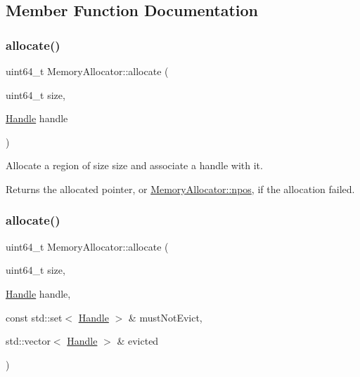 \subsection{Member Function Documentation}
\mbox{\label{classglow_1_1_memory_allocator_a8bd7c15304cb54909cbba8878ea57f7b}} 
\subsubsection{\texorpdfstring{allocate()}{allocate()}\hspace{0.1cm}{\footnotesize\ttfamily [1/2]}}
{\footnotesize\ttfamily uint64\+\_\+t Memory\+Allocator\+::allocate (\begin{DoxyParamCaption}\item[{uint64\+\_\+t}]{size,  }\item[{\hyperlink{classglow_1_1_memory_allocator_a8ebc21e1c9250f73f2e85aca3ae4ae9d}{Handle}}]{handle }\end{DoxyParamCaption})}

Allocate a region of size {\ttfamily size} and associate a {\ttfamily handle} with it. \begin{DoxyReturn}{Returns}
the allocated pointer, or \hyperlink{classglow_1_1_memory_allocator_a41dc4f17fc3b4e242406d9d4a9b419d5}{Memory\+Allocator\+::npos}, if the allocation failed. 
\end{DoxyReturn}
\mbox{\label{classglow_1_1_memory_allocator_a10636a2d9429529641393c60a8f2e4d5}} 
\subsubsection{\texorpdfstring{allocate()}{allocate()}\hspace{0.1cm}{\footnotesize\ttfamily [2/2]}}
{\footnotesize\ttfamily uint64\+\_\+t Memory\+Allocator\+::allocate (\begin{DoxyParamCaption}\item[{uint64\+\_\+t}]{size,  }\item[{\hyperlink{classglow_1_1_memory_allocator_a8ebc21e1c9250f73f2e85aca3ae4ae9d}{Handle}}]{handle,  }\item[{const std\+::set$<$ \hyperlink{classglow_1_1_memory_allocator_a8ebc21e1c9250f73f2e85aca3ae4ae9d}{Handle} $>$ \&}]{must\+Not\+Evict,  }\item[{std\+::vector$<$ \hyperlink{classglow_1_1_memory_allocator_a8ebc21e1c9250f73f2e85aca3ae4ae9d}{Handle} $>$ \&}]{evicted }\end{DoxyParamCaption})}

